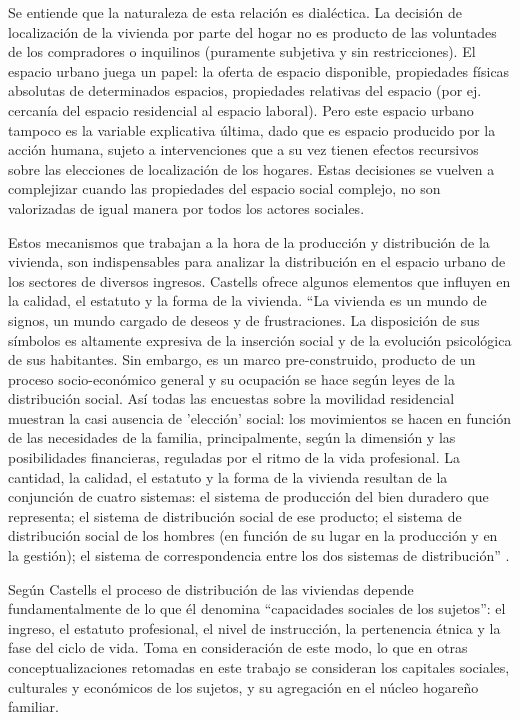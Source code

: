 Se entiende que la naturaleza de esta relación es dialéctica. La decisión de localización de la vivienda por parte del hogar no es producto de las voluntades de los compradores o inquilinos (puramente subjetiva y sin restricciones). El espacio urbano juega un papel: la oferta de espacio disponible, propiedades físicas absolutas de determinados espacios, propiedades relativas del espacio (por ej. cercanía del espacio residencial al espacio laboral). Pero este espacio urbano tampoco es la variable explicativa última, dado que es espacio producido por la acción humana, sujeto a intervenciones que a su vez tienen efectos recursivos sobre las elecciones de localización de los hogares. Estas decisiones se vuelven a complejizar cuando las propiedades del espacio social complejo, no son valorizadas de igual manera por todos los actores sociales. 

Estos mecanismos que trabajan a la hora de la producción y distribución de la vivienda, son indispensables para analizar la distribución en el espacio urbano de los sectores de diversos ingresos. Castells ofrece algunos elementos que influyen en la calidad, el estatuto y la forma de la vivienda. “La vivienda es un mundo de signos, un mundo cargado de deseos y de frustraciones. La disposición de sus símbolos es altamente expresiva de la inserción social y de la evolución psicológica de sus habitantes. Sin embargo, es un marco pre-construido, producto de un proceso socio-económico general y su ocupación se hace según leyes de la distribución social. Así todas las encuestas sobre la movilidad residencial muestran la casi ausencia de 'elección' social: los movimientos se hacen en función de las necesidades de la familia, principalmente, según la dimensión y las posibilidades financieras, reguladas por el ritmo de la vida profesional. La cantidad, la calidad, el estatuto y la forma de la vivienda resultan de la conjunción de cuatro sistemas: el sistema de producción del bien duradero que representa; el sistema de distribución social de ese producto; el sistema de distribución social de los hombres (en función de su lugar en la producción y en la gestión); el sistema de correspondencia entre los dos sistemas de distribución” \cite[~202]{castells}.

Según Castells el proceso de distribución de las viviendas depende fundamentalmente de lo que él denomina “capacidades sociales de los sujetos”: el ingreso, el estatuto profesional, el nivel de instrucción, la pertenencia étnica y la fase del ciclo de vida. Toma en consideración de este modo, lo que en otras conceptualizaciones retomadas en este trabajo se consideran los capitales sociales, culturales y económicos de los sujetos, y su agregación en el núcleo hogareño familiar.

